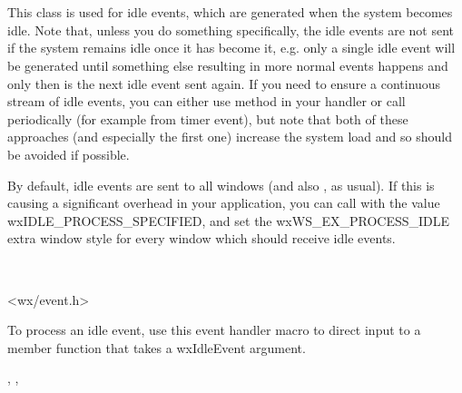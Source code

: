 \section{}\label{wxidleevent}

This class is used for idle events, which are generated when the system becomes
idle. Note that, unless you do something specifically, the idle events are not
sent if the system remains idle once it has become it, e.g. only a single idle
event will be generated until something else resulting in more normal events
happens and only then is the next idle event sent again. If you need to ensure
a continuous stream of idle events, you can either use 
 method in your handler or call 
 periodically (for example from timer
event), but note that both of these approaches (and especially the first one)
increase the system load and so should be avoided if possible.

By default, idle events are sent to all windows (and also 
, as usual). If this is causing a significant
overhead in your application, you can call  with
the value wxIDLE\_PROCESS\_SPECIFIED, and set the wxWS\_EX\_PROCESS\_IDLE extra
window style for every window which should receive idle events.


\\


<wx/event.h>




To process an idle event, use this event handler macro to direct input to a member
function that takes a wxIdleEvent argument.

\twocolwidtha{7cm}
\begin{twocollist}\itemsep=0pt
\end{twocollist}%


, , 

